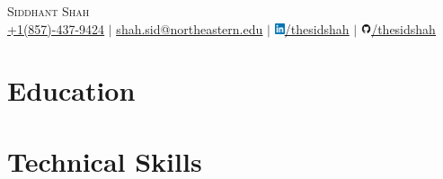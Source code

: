\documentclass[a4paper,11pt]{article}
\begin{document}
\begin{center}
    {\Huge \scshape Siddhant Shah} \\ \vspace{1pt}
    \small \href{tel:8574379424}{\underline{+1(857)-437-9424}} $|$ \href{mailto:shah.sid@northeastern.edu}{\underline{shah.sid@northeastern.edu}} $|$ 
    \small \href{https://linkedin.com/in/thesidshah}{\underline{\includegraphics[height = 0.3cm, width = 0.3cm]{LinkedIn_logo_initials.png}/thesidshah}} $|$
    \small \href{https://github.com/thesidshah}{\underline{\includegraphics[height = 0.3cm, width = 0.3cm]{github.png}/thesidshah}}
\end{center}


\section{Education}

  
\section{Technical Skills}




   

  
\end{document}
